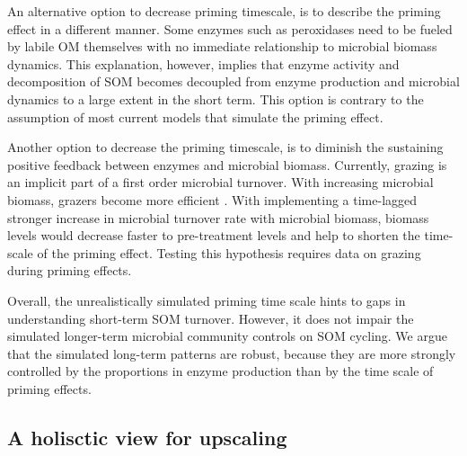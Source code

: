 An alternative option to decrease priming timescale, is to describe the priming
effect in a different manner. Some enzymes such as peroxidases need to be
fueled by labile OM themselves \citep{Rousk14} with no
immediate relationship to microbial biomass dynamics. This explanation, however, implies that enzyme
activity and decomposition of SOM becomes decoupled from enzyme production and
microbial dynamics to a large extent in the short term.
This option is contrary to the assumption of most current models that simulate
the priming effect. 

Another option to decrease the priming timescale, is to diminish the sustaining
positive feedback between enzymes and microbial biomass. Currently, grazing is
an implicit part of a first order microbial turnover. With increasing microbial
biomass, grazers become more efficient \citep{Clarholm81}. With implementing a
time-lagged stronger increase in microbial turnover rate with microbial biomass,
biomass levels would decrease faster to pre-treatment levels and help to shorten
the time-scale of the priming effect. Testing this hypothesis requires data on
grazing during priming effects.

Overall, the unrealistically simulated priming time scale hints to gaps in
understanding short-term SOM turnover. However, it does not impair the simulated
longer-term microbial community controls on SOM cycling. We argue that the
simulated long-term patterns are robust, because they are more strongly
controlled by the proportions in enzyme production than by the time scale of
priming effects.

\subsection{A holisctic view for upscaling}
\label{sec:Holistic}

